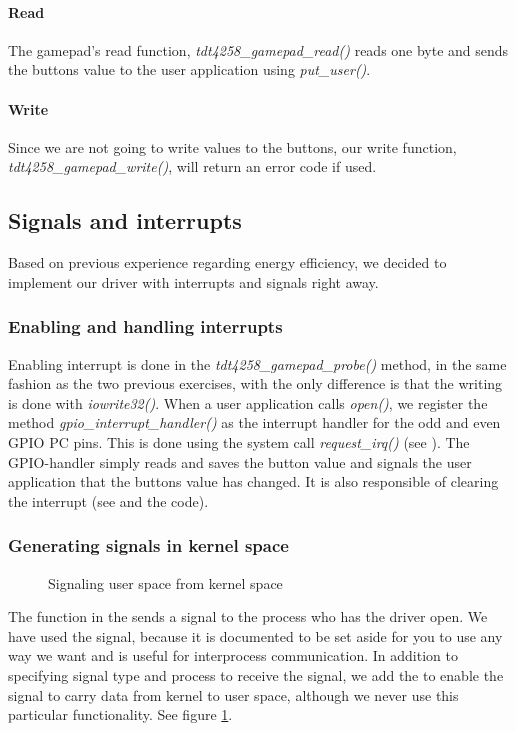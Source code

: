 \paragraph{Read} The gamepad's read function, \emph{tdt4258\_gamepad\_read()} reads one byte and sends the buttons value to the user application using \emph{put\_user()}. 

\paragraph{Write} Since we are not going to write values to the buttons, our write function, \emph{tdt4258\_gamepad\_write()}, will return an error code if used.

\subsection{Signals and interrupts}
\label{subsection:signals-and-interrupts}
Based on previous experience regarding energy efficiency, we decided to implement our driver with interrupts and signals right away.
\subsubsection{Enabling and handling interrupts}

Enabling interrupt is done in the \emph{tdt4258\_gamepad\_probe()} method, in the same fashion as the two previous exercises, with the only difference is that the writing is done with \emph{iowrite32()}. When a user application calls \emph{open()}, we register the method \emph{gpio\_interrupt\_handler()} as the interrupt handler for the odd and even GPIO PC pins. This is done using the system call \emph{request\_irq()} (see \cite{interrupt_handler}). The GPIO-handler simply reads and saves the button value and signals the user application that the buttons value has changed. It is also responsible of clearing the interrupt (see \cite[section 3]{compendium} and the code).   

\subsubsection{Generating signals in kernel space}
\begin{figure}[h]
	\centering
	
	\caption{Signaling user space from kernel space}
	\label{fig:signal-user-application}
\end{figure}
The  function in the  sends a signal to the process who has the driver open. We have used the  signal, because it is documented to be set aside for you to use any way we want and is useful for interprocess communication. In addition to specifying signal type and process to receive the signal, we add the  to enable the signal to carry data from kernel to user space, although we never use this particular functionality. See figure \ref{fig:signal-user-application}.


